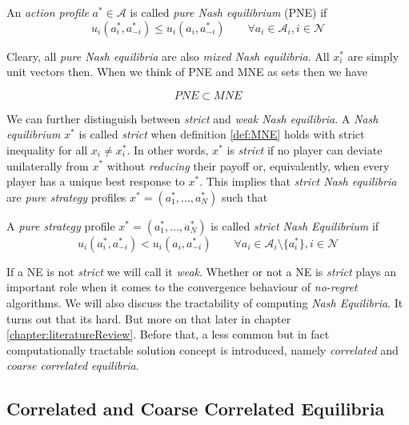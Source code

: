 \begin{definition}\label{def:PNE}
    An \textit{action profile} $a^* \in \mathcal{A}$ is called \textit{pure Nash equilibrium} (PNE) if
    \[u_i(a_{i}^{*},a_{-i}^{*}) \le u_i(a_{i},a_{-i}^{*}) \qquad \forall a_i \in \mathcal{A}_i, i \in \mathcal{N}\]
\end{definition}

Cleary, all \textit{pure Nash equilibria} are also \textit{mixed Nash equilibria}. All $x_{i}^{*}$ are simply unit vectors then. When we think of PNE and MNE as sets then we have 

\begin{equation*}
    PNE \subset MNE
\end{equation*}

We can further distinguish between \textit{strict} and \textit{weak Nash equilibria}. A \textit{Nash equilibrium} $x^*$ is called \textit{strict} when definition \ref{def:MNE} holds with strict inequality for all $x_i \neq x_{i}^{*}$. In other words, $x^*$ is \textit{strict} if no player can deviate unilaterally from $x^*$ without \textit{reducing} their payoff or, equivalently, when every player has a unique best response to $x^*$. This implies that \textit{strict Nash equilibria} are \textit{pure strategy} profiles $x^* = (a_{1}^{*},\dots,a_{N}^{*})$ such that

\begin{definition}\label{def:strictNE}
    A \textit{pure strategy} profile $x^* = (a_{1}^{*},\dots,a_{N}^{*})$ is called \textit{strict Nash Equilibrium} if
    \[u_i(a_{i}^{*},a_{-i}^{*}) < u_i(a_{i},a_{-i}^{*}) \qquad \forall a_i \in \mathcal{A}_i \setminus \{a_{i}^{*}\} , i \in \mathcal{N}\]
\end{definition}

If a NE is not \textit{strict} we will call it \textit{weak}. Whether or not a NE is \textit{strict} plays an important role when it comes to the convergence behaviour of \textit{no-regret} algorithms. We will also discuss the tractability of computing \textit{Nash Equilibria}. It turns out that its hard. But more on that later in chapter \ref{chapter:literatureReview}. Before that, a less common but in fact computationally tractable solution concept is introduced, namely \textit{correlated} and \textit{coarse correlated equilibria}.\\

\subsection{Correlated and Coarse Correlated Equilibria}\label{subsection:CEandCCE}

